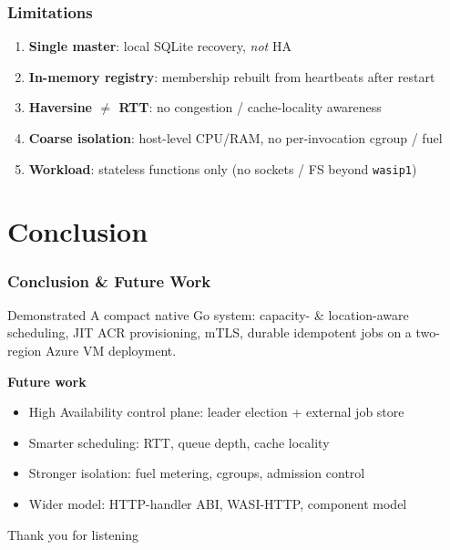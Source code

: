 \documentclass[11pt, aspectratio=169]{beamer}
\begin{document}
\begin{frame}
	\frametitle{Limitations}
	\begin{enumerate}
		\item \textbf{Single master}: local SQLite recovery, \emph{not} HA
		\item \textbf{In-memory registry}: membership rebuilt from heartbeats after restart
		\item \textbf{Haversine $\neq$ RTT}: no congestion / cache-locality awareness
		\item \textbf{Coarse isolation}: host-level CPU/RAM, no per-invocation cgroup / fuel
		\item \textbf{Workload}: stateless functions only (no sockets / FS beyond \texttt{wasip1})
	\end{enumerate}
\end{frame}

\section{Conclusion}

\begin{frame}
	\frametitle{Conclusion \& Future Work}
	\begin{block}{Demonstrated}
		A compact native Go system: capacity- \& location-aware scheduling, JIT ACR provisioning, mTLS, durable idempotent jobs on a two-region Azure VM deployment.
	\end{block}
	\bigskip
	\textbf{Future work}
	\begin{itemize}
		\item High Availability control plane: leader election + external job store
		\item Smarter scheduling: RTT, queue depth, cache locality
		\item Stronger isolation: fuel metering, cgroups, admission control
		\item Wider model: HTTP-handler ABI, WASI-HTTP, component model
	\end{itemize}
\end{frame}

\begin{frame}[plain]
	\begin{center}
		{\Huge Thank you for listening}\\[1.2em]
	\end{center}
\end{frame}
\end{document}
